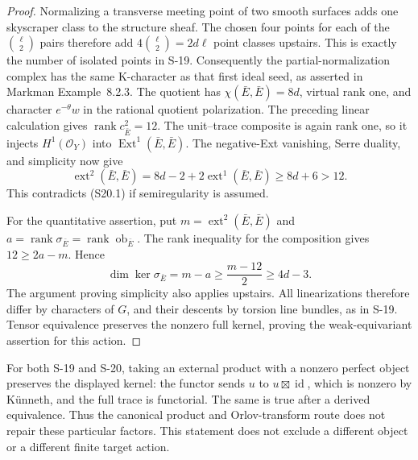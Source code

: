 \documentclass[11pt,a4paper]{article}
\theoremstyle{definition}
\begin{document}
\begin{proof}
Normalizing a transverse meeting point of two smooth
surfaces adds one skyscraper class to the structure sheaf.
The chosen four points for each of the $\binom\ell2$ pairs
therefore add $4\binom\ell2=2d\ell$ point classes upstairs.
This is exactly the number of isolated points in S-19.
Consequently the partial-normalization complex has the same
K-character as that first ideal seed, as asserted in
Markman Example~8.2.3. The quotient has
$\chi(\bar E,\bar E)=8d$, virtual rank one, and character
$e^{-\theta}w$ in the rational quotient polarization.
The preceding linear calculation gives
$\operatorname{rank}c_{\bar E}^2=12$.
The unit--trace composite is again rank one, so it injects
$H^1(\mathcal O_Y)$ into
$\operatorname{Ext}^1(\bar E,\bar E)$.
The negative-Ext vanishing, Serre duality, and simplicity
now give
\[
 \operatorname{ext}^2(\bar E,\bar E)
 =8d-2+2\operatorname{ext}^1(\bar E,\bar E)
 \ge8d+6>12.
\]
This contradicts (S20.1) if semiregularity is assumed.

For the quantitative assertion, put
$m=\operatorname{ext}^2(\bar E,\bar E)$ and
$a=\operatorname{rank}\sigma_{\bar E}
=\operatorname{rank}\operatorname{ob}_{\bar E}$.
The rank inequality for the composition gives
$12\ge2a-m$. Hence
\[
 \dim\ker\sigma_{\bar E}=m-a
 \ge\frac{m-12}{2}\ge4d-3.
\]
The argument proving simplicity also applies upstairs.
All linearizations therefore differ by characters of $G$,
and their descents by torsion line bundles, as in S-19.
Tensor equivalence preserves the nonzero full kernel,
proving the weak-equivariant assertion for this action.
\end{proof}

For both S-19 and S-20, taking an external product with a
nonzero perfect object preserves the displayed kernel:
the functor sends $u$ to $u\boxtimes\operatorname{id}$,
which is nonzero by K\"unneth, and the full trace is functorial.
The same is true after a derived equivalence.
Thus the canonical product and Orlov-transform route does not
repair these particular factors. This statement does not
exclude a different object or a different finite target action.
\end{document}
